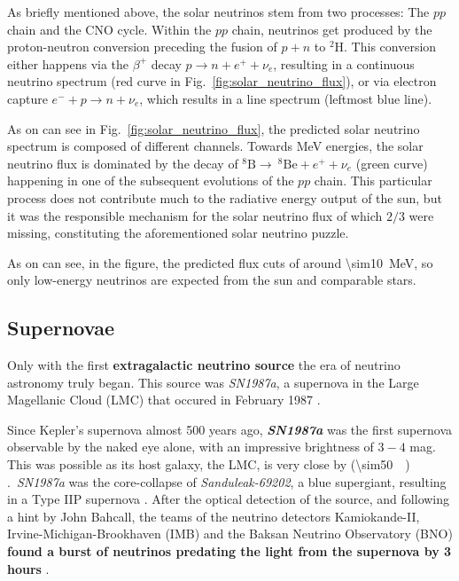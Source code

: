 As briefly mentioned above, the solar neutrinos stem from two processes: The $pp$ chain and the CNO cycle. Within the $pp$ chain, neutrinos get produced by the proton-neutron conversion preceding the fusion of $p+n$ to $^2 \text{H}$. This conversion either happens via the $\beta^+$ decay $p \rightarrow n + e^+ + \nu_e$, resulting in a continuous neutrino spectrum (red curve in Fig.~\ref{fig:solar_neutrino_flux}), or via electron capture $e^- + p \rightarrow n + \nu_e$, which results in a line spectrum (leftmost blue line).

As on can see in Fig.~\ref{fig:solar_neutrino_flux}, the predicted solar neutrino spectrum is composed of different channels. Towards \unit{\mega\eV} energies, the solar neutrino flux is dominated by the decay of $^8\text{B}\rightarrow ~^8\text{Be} + e^+ + \nu_e$ (green curve) happening in one of the subsequent evolutions of the $pp$ chain. This particular process does not contribute much to the radiative energy output of the sun, but it was the responsible mechanism for the solar neutrino flux of which $2/3$ were missing, constituting the aforementioned solar neutrino puzzle.

As on can see, in the figure, the predicted flux cuts of around \SI{\sim10}{\mega\eV}, so only low-energy neutrinos are expected from the sun and comparable stars.

\subsection{Supernovae}\label{sne}
Only with the first \textbf{extragalactic neutrino source} the era of neutrino astronomy truly began. This source was \emph{SN1987a}, a supernova in the Large Magellanic Cloud (LMC) that occured in February 1987 .

Since Kepler's supernova almost 500 years ago, \textbf{\emph{SN1987a}} was the first supernova observable by the naked eye alone, with an impressive brightness of $3-4$ mag. This was possible as its host galaxy, the LMC, is very close by (\SI{\sim50}{\kilo\parsec}) .\ \emph{SN1987a} was the core-collapse of \emph{Sanduleak-69202}, a blue supergiant, resulting in a Type IIP supernova . After the optical detection of the source, and following a hint by John Bahcall, the teams of the neutrino detectors Kamiokande-II, Irvine-Michigan-Brookhaven (IMB) and the Baksan Neutrino Observatory (BNO) \textbf{found a burst of neutrinos predating the light from the supernova by 3 hours} .

